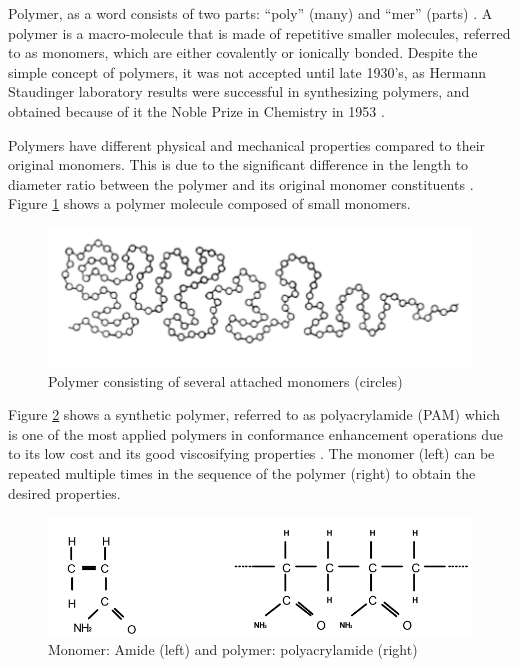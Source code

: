  Polymer, as a word consists of two parts: “poly” (many) and “mer” (parts) . A polymer is a macro-molecule that is made of repetitive smaller molecules, referred to as monomers, which are either covalently or ionically bonded. Despite the simple concept of polymers, it was not accepted until late 1930’s, as Hermann Staudinger laboratory results were successful in synthesizing polymers, and obtained because of it the Noble Prize in Chemistry in 1953 \citep{Roberts1977}.

Polymers have different physical and mechanical properties compared to their original
monomers. This is due to the significant difference in the length to diameter ratio between the polymer and its original monomer constituents \citep{Ghosh2006}. Figure \ref{fig:polymer} shows a polymer molecule composed of small monomers.

\begin{figure}
    \centering
    \includegraphics[width=\textwidth]{img/fig/polymer.png}
    \caption{Polymer consisting of several attached monomers (circles) \citep{Ghosh2006}}
    \label{fig:polymer} %
\end{figure}

Figure \ref{fig:polymonomer} shows a synthetic polymer, referred to as polyacrylamide (PAM) which is one of the most applied polymers in conformance enhancement operations due to its low cost and its good viscosifying properties \citep{Kabir2001}. The monomer (left) can be repeated multiple times in the sequence of the polymer (right) to obtain the desired properties.

\begin{figure}
    \centering
    \includegraphics[width=\textwidth]{img/fig/polymonomer.png}
    \caption{Monomer: Amide (left) and polymer: polyacrylamide (right) \citep{Kabir2001}}
    \label{fig:polymonomer} %
\end{figure}

